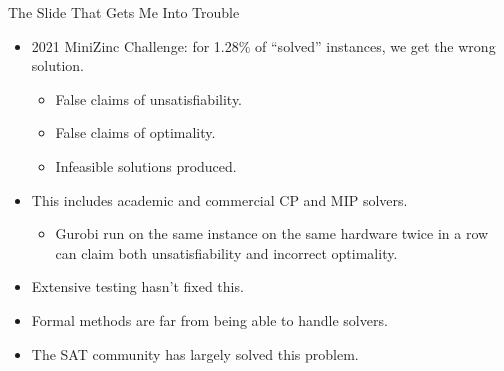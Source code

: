 \documentclass[aspectratio=169,compress,10pt]{beamer}
\begin{document}
\begin{frame}{The Slide That Gets Me Into Trouble}
    \begin{itemize}
        \item 2021 MiniZinc Challenge: for 1.28\% of ``solved'' instances, we get the wrong solution.
            \begin{itemize}
                \item False claims of unsatisfiability.
                \item False claims of optimality.
                \item Infeasible solutions produced.
            \end{itemize}
        \item This includes academic and commercial CP and MIP solvers.
            \begin{itemize}
                \item Gurobi run on the same instance on the same hardware twice in a row
                    can claim both unsatisfiability and incorrect optimality.
            \end{itemize}
        \item <2-> Extensive testing hasn't fixed this.
        \item <2-> Formal methods are far from being able to handle solvers.
        \item <3-> The SAT community has largely solved this problem.
    \end{itemize}
\end{frame}
\end{document}
